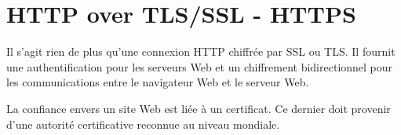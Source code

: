 \section{HTTP over TLS/SSL - HTTPS}
Il s'agit rien de plus qu'une connexion HTTP chiffrée par SSL ou TLS.
Il fournit une authentification pour les serveurs Web et un chiffrement bidirectionnel pour les communications entre le navigateur Web et le serveur Web.

La confiance envers un site Web est liée à un certificat. 
Ce dernier doit provenir d'une autorité certificative reconnue au niveau mondiale. 